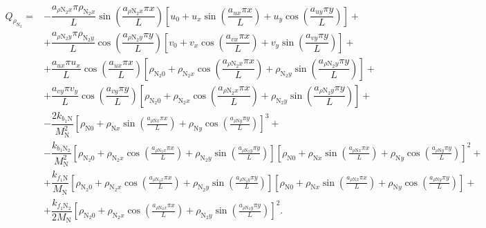 \documentclass[10pt]{article}
\begin{document}
\begin{landscape}
\begin{equation}
\begin{split}
Q_{\rho_{\text{N}_2}} = &- \dfrac{a_{ \rho \text{N}_2 x } \pi \rho_{\text{N}_2 x}}{L}\sin\left( \dfrac{a_{ \rho \text{N}_2 x } \pi x}{L}\right) \left[u_0+u_x \sin\left( \dfrac{a_{ux} \pi x}{L}\right)+u_y \cos\left( \dfrac{a_{uy} \pi y}{L}\right)\right] + \\
&+ \dfrac{a_{ \rho \text{N}_2 y } \pi \rho_{\text{N}_2 y}}{L} \cos\left( \dfrac{a_{ \rho \text{N}_2 y } \pi y}{L}\right) \left[v_0+v_x \cos\left( \dfrac{a_{vx} \pi x}{L}\right)+v_y \sin\left( \dfrac{a_{vy} \pi y}{L}\right)\right] + \\
&+\dfrac{a_{ux} \pi u_x }{L}\cos\left( \dfrac{a_{ux} \pi x}{L}\right) \left[\rho_{\text{N}_2 0}+\rho_{\text{N}_2 x} \cos\left( \dfrac{a_{ \rho \text{N}_2 x } \pi x}{L}\right)+\rho_{\text{N}_2 y} \sin\left( \dfrac{a_{ \rho \text{N}_2 y } \pi y}{L}\right)\right] + \\
&+\dfrac{a_{vy} \pi v_y }{L}\cos\left( \dfrac{a_{vy} \pi y}{L}\right) \left[\rho_{\text{N}_2 0}+\rho_{\text{N}_2 x} \cos\left( \dfrac{a_{ \rho \text{N}_2 x } \pi x}{L}\right)+\rho_{\text{N}_2 y} \sin\left( \dfrac{a_{ \rho \text{N}_2 y } \pi y}{L}\right)\right] + \\
&- \dfrac{ 2 k_{b_1 \text{N}}}{M_{\text{N}}^2} \left[\rho_{\text{N}0} + \rho_{\text{N}x} \sin\left(\frac{a_{ \rho \text{N} x} \pi x}{L}\right)+ \rho_{\text{N} y} \cos\left(\frac{a_{ \rho \text{N} y} \pi y}{L}\right)\right]^3 +\\
& - \dfrac{ k_{b_1 \text{N}_2}}{M_{\text{N}}^2} \left[\rho_{\text{N}_2 0}+ \rho_{\text{N}_2 x} \cos\left(\frac{a_{ \rho \text{N}_2 x} \pi x}{L}\right)+ \rho_{\text{N}_2 y} \sin\left(\frac{a_{ \rho \text{N}_2 y} \pi y}{L}\right)\right] \left[\rho_{\text{N}0} + \rho_{\text{N}x} \sin\left(\frac{a_{ \rho \text{N} x} \pi x}{L}\right)+ \rho_{\text{N} y} \cos\left(\frac{a_{ \rho \text{N} y} \pi y}{L}\right)\right]^2 +\\
&+ \dfrac{ k_{f_1 \text{N}} }{M_{\text{N}}} \left[\rho_{\text{N}_2 0}+ \rho_{\text{N}_2 x} \cos\left(\frac{a_{ \rho \text{N}_2 x} \pi x}{L}\right)+ \rho_{\text{N}_2 y} \sin\left(\frac{a_{ \rho \text{N}_2 y} \pi y}{L}\right)\right] \left[\rho_{\text{N}0} + \rho_{\text{N}x} \sin\left(\frac{a_{ \rho \text{N} x} \pi x}{L}\right)+ \rho_{\text{N} y} \cos\left(\frac{a_{ \rho \text{N} y} \pi y}{L}\right)\right]+\\
&+ \dfrac{k_{f_1 \text{N}_2} }{2 M_{\text{N}}} \left[\rho_{\text{N}_2 0}+ \rho_{\text{N}_2 x} \cos\left(\frac{a_{ \rho \text{N}_2 x} \pi x}{L}\right)+ \rho_{\text{N}_2 y} \sin\left(\frac{a_{ \rho \text{N}_2 y} \pi y}{L}\right)\right]^2.
\end{split}
\end{equation}





\end{landscape}
\end{document}
